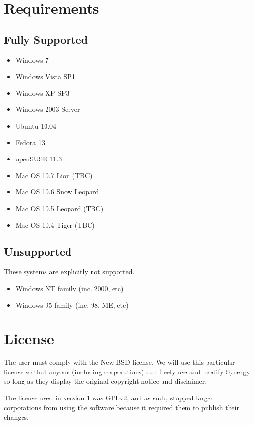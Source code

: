\section{Requirements}

\subsection{Fully Supported}

\begin{itemize}
  \item Windows 7
  \item Windows Vista SP1
  \item Windows XP SP3
  \item Windows 2003 Server
  \item Ubuntu 10.04
  \item Fedora 13
  \item openSUSE 11.3
  \item Mac OS 10.7 Lion (TBC)
  \item Mac OS 10.6 Snow Leopard
  \item Mac OS 10.5 Leopard (TBC)
  \item Mac OS 10.4 Tiger (TBC)
\end{itemize}

\subsection{Unsupported}

These systems are explicitly not supported.

\begin{itemize}
  \item Windows NT family (inc. 2000, etc)
  \item Windows 95 family (inc. 98, ME, etc)
\end{itemize}

\section*{License}

The user must comply with the New BSD license. We will use this particular 
license so that anyone (including corporations) can freely use and modify 
Synergy so long as they display the original copyright notice and disclaimer.

The license used in version 1 was GPLv2, and as such, stopped larger 
corporations from using the software because it required them to publish
their changes.
